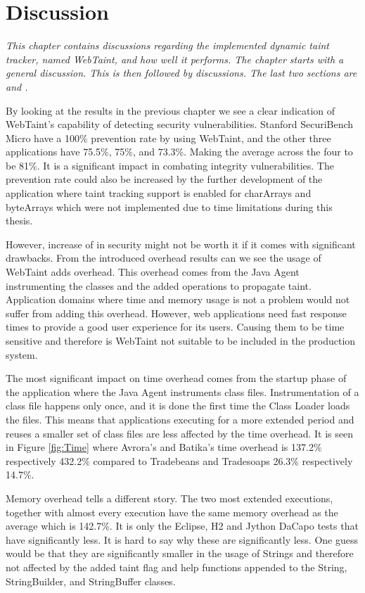 \chapter{Discussion}
\label{Discussion}
\textit{This chapter contains discussions regarding the implemented dynamic taint tracker, named WebTaint, and how well it performs. The chapter starts with a general discussion. This is then followed by \textit{} discussions. The last two sections are \textit{} and \textit{}.}

By looking at the results in the previous chapter we see a clear indication of WebTaint's capability of detecting security vulnerabilities. Stanford SecuriBench Micro have a 100\% prevention rate by using WebTaint, and the other three applications have 75.5\%, 75\%, and 73.3\%. Making the average across the four to be 81\%. It is a significant impact in combating integrity vulnerabilities. The prevention rate could also be increased by the further development of the application where taint tracking support is enabled for charArrays and byteArrays which were not implemented due to time limitations during this thesis.

However, increase of in security might not be worth it if it comes with significant drawbacks. From the introduced overhead results can we see the usage of WebTaint adds overhead. This overhead comes from the Java Agent instrumenting the classes and the added operations to propagate taint. Application domains where time and memory usage is not a problem would not suffer from adding this overhead. However, web applications need fast response times to provide a good user experience for its users. Causing them to be time sensitive and therefore is WebTaint not suitable to be included in the production system.

The most significant impact on time overhead comes from the startup phase of the application where the Java Agent instruments class files. Instrumentation of a class file happens only once, and it is done the first time the Class Loader loads the files. This means that applications executing for a more extended period and reuses a smaller set of class files are less affected by the time overhead. It is seen in Figure \ref{fig:Time} where Avrora's and Batika's time overhead is 137.2\% respectively 432.2\% compared to Tradebeans and Tradesoaps 26.3\% respectively 14.7\%.

Memory overhead tells a different story. The two most extended executions, together with almost every execution have the same memory overhead as the average which is 142.7\%. It is only the Eclipse, H2 and Jython DaCapo tests that have significantly less. It is hard to say why these are significantly less. One guess would be that they are significantly smaller in the usage of Strings and therefore not affected by the added taint flag and help functions appended to the String, StringBuilder, and StringBuffer classes.



